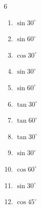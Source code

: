 \begin{multicols}{6}
\begin{enumerate}

  \item $\displaystyle \sin{30^\circ}$


  \item $\displaystyle \sin{60^\circ}$


  \item $\displaystyle \cos{30^\circ}$


  \item $\displaystyle \sin{30^\circ}$


  \item $\displaystyle \sin{60^\circ}$


  \item $\displaystyle \tan{30^\circ}$


  \item $\displaystyle \tan{60^\circ}$


  \item $\displaystyle \tan{30^\circ}$


  \item $\displaystyle \sin{30^\circ}$


  \item $\displaystyle \cos{60^\circ}$


  \item $\displaystyle \sin{30^\circ}$


  \item $\displaystyle \cos{45^\circ}$



\end{enumerate}
\end{multicols}
